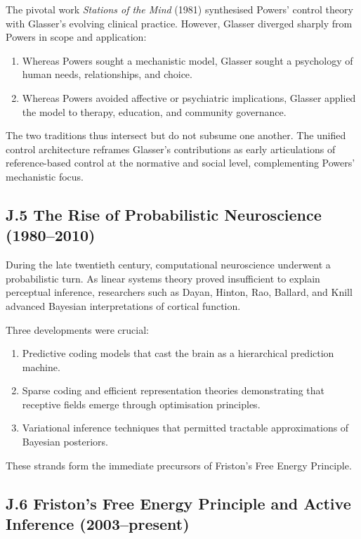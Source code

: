 \documentclass[11pt,a4paper,twoside]{article}
\begin{document}
The pivotal work \emph{Stations of the Mind} (1981) synthesised Powers’ control theory with Glasser’s evolving clinical practice.
However, Glasser diverged sharply from Powers in scope and application:

\begin{enumerate}
\item Whereas Powers sought a mechanistic model, Glasser sought a psychology of human needs, relationships, and choice.
\item Whereas Powers avoided affective or psychiatric implications, Glasser applied the model to therapy, education, and community governance.
\end{enumerate}

The two traditions thus intersect but do not subsume one another.
The unified control architecture reframes Glasser’s contributions as early articulations of reference-based control at the normative and social level, complementing Powers’ mechanistic focus.

\subsection*{J.5 The Rise of Probabilistic Neuroscience (1980--2010)}

During the late twentieth century, computational neuroscience underwent a probabilistic turn.
As linear systems theory proved insufficient to explain perceptual inference, researchers such as Dayan, Hinton, Rao, Ballard, and Knill advanced Bayesian interpretations of cortical function.

Three developments were crucial:

\begin{enumerate}
\item Predictive coding models that cast the brain as a hierarchical prediction machine.
\item Sparse coding and efficient representation theories demonstrating that receptive fields emerge through optimisation principles.
\item Variational inference techniques that permitted tractable approximations of Bayesian posteriors.
\end{enumerate}

These strands form the immediate precursors of Friston’s Free Energy Principle.

\subsection*{J.6 Friston’s Free Energy Principle and Active Inference (2003--present)}
\end{document}
